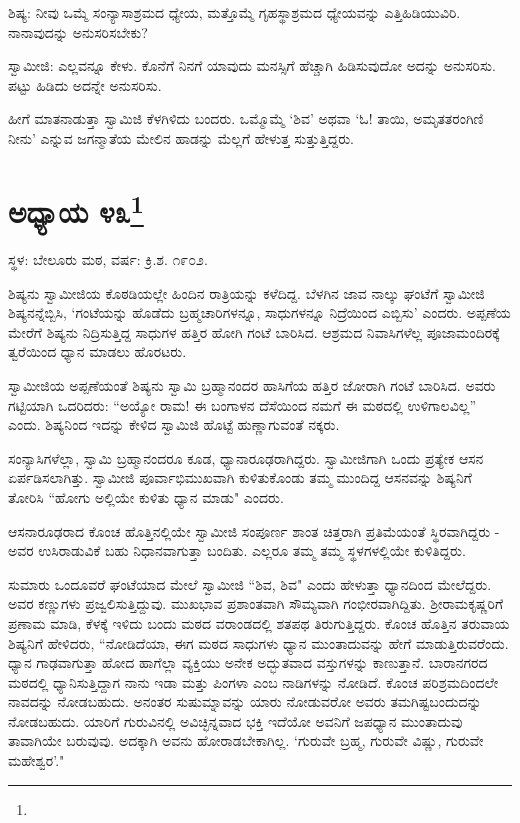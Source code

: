 ಶಿಷ್ಯ: ನೀವು ಒಮ್ಮೆ ಸಂನ್ಯಾಸಾಶ್ರಮದ ಧ್ಯೇಯ, ಮತ್ತೊಮ್ಮೆ ಗೃಹಸ್ಥಾಶ್ರಮದ ಧ್ಯೇಯವನ್ನು ಎತ್ತಿಹಿಡಿಯುವಿರಿ. ನಾನಾವುದನ್ನು ಅನುಸರಿಸಬೇಕು?

ಸ್ವಾಮೀಜಿ: ಎಲ್ಲವನ್ನೂ ಕೇಳು. ಕೊನೆಗೆ ನಿನಗೆ ಯಾವುದು ಮನಸ್ಸಿಗೆ ಹೆಚ್ಚಾಗಿ ಹಿಡಿಸುವುದೋ ಅದನ್ನು ಅನುಸರಿಸು. ಪಟ್ಟು ಹಿಡಿದು ಅದನ್ನೇ ಅನುಸರಿಸು.

ಹೀಗೆ ಮಾತನಾಡುತ್ತಾ ಸ್ವಾಮಿಜಿ ಕೆಳಗಿಳಿದು ಬಂದರು. ಒಮ್ಮೊಮ್ಮೆ ‘ಶಿವ’ ಅಥವಾ ‘ಓ! ತಾಯಿ, ಅಮೃತತರಂಗಿಣಿ ನೀನು’ ಎನ್ನುವ ಜಗನ್ಮಾತೆಯ ಮೇಲಿನ ಹಾಡನ್ನು ಮೆಲ್ಲಗೆ ಹೇಳುತ್ತ ಸುತ್ತುತ್ತಿದ್ದರು.

\newpage

\chapter[ಅಧ್ಯಾಯ ೪೩]{ಅಧ್ಯಾಯ ೪೩\protect\footnote{}}

\begin{center}
ಸ್ಥಳ: ಬೇಲೂರು ಮಠ, ವರ್ಷ: ಕ್ರಿ.ಶ. ೧೯೦೨.
\end{center}

ಶಿಷ್ಯನು ಸ್ವಾಮೀಜಿಯ ಕೊಠಡಿಯಲ್ಲೇ ಹಿಂದಿನ ರಾತ್ರಿಯನ್ನು ಕಳೆದಿದ್ದ. ಬೆಳಗಿನ ಜಾವ ನಾಲ್ಕು ಘಂಟೆಗೆ ಸ್ವಾಮೀಜಿ ಶಿಷ್ಯನನ್ನೆಬ್ಬಿಸಿ, ‘ಗಂಟೆಯನ್ನು ಹೊಡೆದು ಬ್ರಹ್ಮಚಾರಿಗಳನ್ನೂ, ಸಾಧುಗಳನ್ನೂ ನಿದ್ರೆಯಿಂದ ಎಬ್ಬಿಸು’ ಎಂದರು. ಅಪ್ಪಣೆಯ ಮೇರೆಗೆ ಶಿಷ್ಯನು ನಿದ್ರಿಸುತ್ತಿದ್ದ ಸಾಧುಗಳ ಹತ್ತಿರ ಹೋಗಿ ಗಂಟೆ ಬಾರಿಸಿದ. ಆಶ್ರಮದ ನಿವಾಸಿಗಳೆಲ್ಲ ಪೂಜಾಮಂದಿರಕ್ಕೆ ತ್ವರೆಯಿಂದ ಧ್ಯಾನ ಮಾಡಲು ಹೊರಟರು.

ಸ್ವಾಮೀಜಿಯ ಅಪ್ಪಣೆಯಂತೆ ಶಿಷ್ಯನು ಸ್ವಾಮಿ ಬ್ರಹ್ಮಾನಂದರ ಹಾಸಿಗೆಯ ಹತ್ತಿರ ಜೋರಾಗಿ ಗಂಟೆ ಬಾರಿಸಿದ. ಅವರು ಗಟ್ಟಿಯಾಗಿ ಒದರಿದರು: “ಅಯ್ಯೋ ರಾಮ! ಈ ಬಂಗಾಳನ ದೆಸೆಯಿಂದ ನಮಗೆ ಈ ಮಠದಲ್ಲಿ ಉಳಿಗಾಲವಿಲ್ಲ” ಎಂದು. ಶಿಷ್ಯನಿಂದ ಇದನ್ನು ಕೇಳಿದ ಸ್ವಾಮಿಜಿ ಹೊಟ್ಟೆ ಹುಣ್ಣಾಗುವಂತೆ ನಕ್ಕರು.

ಸಂನ್ಯಾಸಿಗಳೆಲ್ಲಾ, ಸ್ವಾಮಿ ಬ್ರಹ್ಮಾನಂದರೂ ಕೂಡ, ಧ್ಯಾನಾರೂಢರಾಗಿದ್ದರು. ಸ್ವಾಮೀಜಿಗಾಗಿ ಒಂದು ಪ್ರತ್ಯೇಕ ಆಸನ ಏರ್ಪಡಿಸಲಾಗಿತ್ತು. ಸ್ವಾಮೀಜಿ ಪೂರ್ವಾಭಿಮುಖವಾಗಿ ಕುಳಿತುಕೊಂಡು ತಮ್ಮ ಮುಂದಿದ್ದ ಆಸನವನ್ನು ಶಿಷ್ಯನಿಗೆ ತೋರಿಸಿ “ಹೋಗು ಅಲ್ಲಿಯೇ ಕುಳಿತು ಧ್ಯಾನ ಮಾಡು" ಎಂದರು.

ಆಸನಾರೂಢರಾದ ಕೊಂಚ ಹೊತ್ತಿನಲ್ಲಿಯೇ ಸ್ವಾಮೀಜಿ ಸಂಪೂರ್ಣ ಶಾಂತ ಚಿತ್ತರಾಗಿ ಪ್ರತಿಮೆಯಂತೆ ಸ್ಥಿರವಾಗಿದ್ದರು - ಅವರ ಉಸಿರಾಡುವಿಕೆ ಬಹು ನಿಧಾನವಾಗುತ್ತಾ ಬಂದಿತು. ಎಲ್ಲರೂ ತಮ್ಮ ತಮ್ಮ ಸ್ಥಳಗಳಲ್ಲಿಯೇ ಕುಳಿತಿದ್ದರು.

ಸುಮಾರು ಒಂದೂವರೆ ಘಂಟೆಯಾದ ಮೇಲೆ ಸ್ವಾಮೀಜಿ “ಶಿವ, ಶಿವ" ಎಂದು ಹೇಳುತ್ತಾ ಧ್ಯಾನದಿಂದ ಮೇಲೆದ್ದರು. ಅವರ ಕಣ್ಣುಗಳು ಪ್ರಜ್ವಲಿಸುತ್ತಿದ್ದುವು. ಮುಖಭಾವ ಪ್ರಶಾಂತವಾಗಿ ಸೌಮ್ಯವಾಗಿ ಗಂಭೀರವಾಗಿದ್ದಿತು. ಶ‍್ರೀರಾಮಕೃಷ್ಣರಿಗೆ ಪ್ರಣಾಮ ಮಾಡಿ, ಕೆಳಕ್ಕೆ ಇಳಿದು ಬಂದು ಮಠದ ವರಾಂಡದಲ್ಲಿ ಶತಪಥ ತಿರುಗುತ್ತಿದ್ದರು. ಕೊಂಚ ಹೊತ್ತಿನ ತರುವಾಯ ಶಿಷ್ಯನಿಗೆ ಹೇಳಿದರು, “ನೋಡಿದೆಯಾ, ಈಗ ಮಠದ ಸಾಧುಗಳು ಧ್ಯಾನ ಮುಂತಾದುವನ್ನು ಹೇಗೆ ಮಾಡುತ್ತಿರುವರೆಂದು. ಧ್ಯಾನ ಗಾಢವಾಗುತ್ತಾ ಹೋದ ಹಾಗೆಲ್ಲಾ ವ್ಯಕ್ತಿಯು ಅನೇಕ ಅದ್ಭುತವಾದ ವಸ್ತುಗಳನ್ನು ಕಾಣುತ್ತಾನೆ. ಬಾರಾನಗರದ ಮಠದಲ್ಲಿ ಧ್ಯಾನಿಸುತ್ತಿದ್ದಾಗ ನಾನು ಇಡಾ ಮತ್ತು ಪಿಂಗಳಾ ಎಂಬ ನಾಡಿಗಳನ್ನು ನೋಡಿದೆ. ಕೊಂಚ ಪರಿಶ್ರಮದಿಂದಲೇ ನಾವದನ್ನು ನೋಡಬಹುದು. ಅನಂತರ ಸುಷುಮ್ನಾವನ್ನು ಯಾರು ನೋಡುವರೋ ಅವರು ತಮಗಿಷ್ಟಬಂದುದನ್ನು ನೋಡಬಹುದು. ಯಾರಿಗೆ ಗುರುವಿನಲ್ಲಿ ಅವಿಚ್ಛಿನ್ನವಾದ ಭಕ್ತಿ ಇದೆಯೋ ಅವನಿಗೆ ಜಪಧ್ಯಾನ ಮುಂತಾದುವು ತಾವಾಗಿಯೇ ಬರುವುವು. ಅದಕ್ಕಾಗಿ ಅವನು ಹೋರಾಡಬೇಕಾಗಿಲ್ಲ. ‘ಗುರುವೇ ಬ್ರಹ್ಮ, ಗುರುವೇ ವಿಷ್ಣು, ಗುರುವೇ ಮಹೇಶ್ವರ’."

